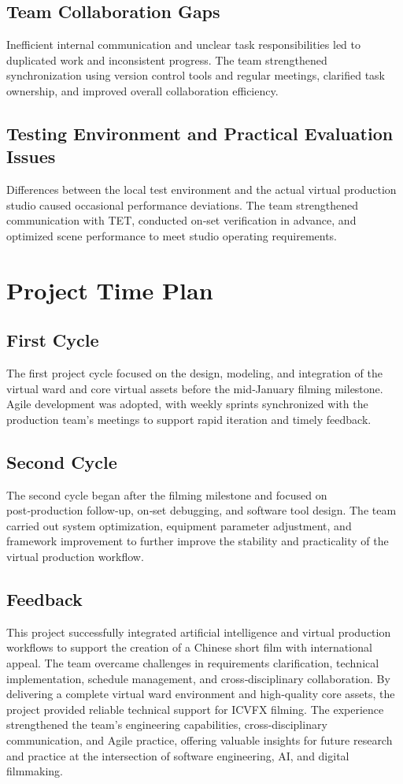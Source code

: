 \documentclass[12pt,a4paper]{report}
\begin{document}
\subsection{Team Collaboration Gaps}
Inefficient internal communication and unclear task responsibilities led to duplicated work and inconsistent progress. The team strengthened synchronization using version control tools and regular meetings, clarified task ownership, and improved overall collaboration efficiency.

\subsection{Testing Environment and Practical Evaluation Issues}
Differences between the local test environment and the actual virtual production studio caused occasional performance deviations. The team strengthened communication with TET, conducted on‑set verification in advance, and optimized scene performance to meet studio operating requirements.

\section{Project Time Plan}

\subsection{First Cycle}
The first project cycle focused on the design, modeling, and integration of the virtual ward and core virtual assets before the mid‑January filming milestone. Agile development was adopted, with weekly sprints synchronized with the production team’s meetings to support rapid iteration and timely feedback.

\subsection{Second Cycle}
The second cycle began after the filming milestone and focused on post‑production follow‑up, on‑set debugging, and software tool design. The team carried out system optimization, equipment parameter adjustment, and framework improvement to further improve the stability and practicality of the virtual production workflow.

\subsection{Feedback}
This project successfully integrated artificial intelligence and virtual production workflows to support the creation of a Chinese short film with international appeal. The team overcame challenges in requirements clarification, technical implementation, schedule management, and cross‑disciplinary collaboration. By delivering a complete virtual ward environment and high‑quality core assets, the project provided reliable technical support for ICVFX filming. The experience strengthened the team’s engineering capabilities, cross‑disciplinary communication, and Agile practice, offering valuable insights for future research and practice at the intersection of software engineering, AI, and digital filmmaking.
\end{document}
